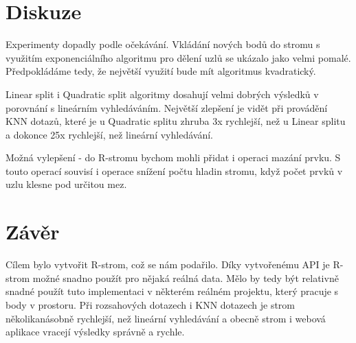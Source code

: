 \documentclass[a4paper,10pt]{article}
\begin{document}
\section{Diskuze}
Experimenty dopadly podle očekávání. Vkládání nových bodů do stromu s využitím exponenciálního algoritmu pro dělení uzlů se ukázalo jako velmi pomalé. Předpokládáme tedy, že největší využití bude mít algoritmus kvadratický. 

Linear split i Quadratic split algoritmy dosahují velmi dobrých výsledků v porovnání s lineárním vyhledáváním. Největší zlepšení je vidět při provádění KNN dotazů, které je u Quadratic splitu zhruba 3x rychlejší, než u Linear splitu a dokonce 25x rychlejší, než lineární vyhledávání.

Možná vylepšení - do R-stromu bychom mohli přidat i operaci mazání prvku. S touto operací souvisí i operace snížení počtu hladin stromu, když počet prvků v uzlu klesne pod určitou mez.

\section{Závěr}
Cílem bylo vytvořit R-strom, což se nám podařilo. Díky vytvořenému API je R-strom možné snadno použít pro nějaká reálná data. Mělo by tedy být relativně snadné použít tuto implementaci v některém reálném projektu, který pracuje s body v prostoru. Při rozsahových dotazech i KNN dotazech je strom několikanásobně rychlejší, než lineární vyhledávání a obecně strom i webová aplikace vracejí výsledky správně a rychle.
\end{document}
